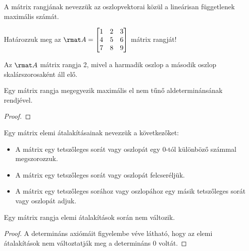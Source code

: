 \begin{definition}
  A mátrix rangjának nevezzük az oszlopvektorai közül a lineárisan függetlenek
  maximális számát.
\end{definition}

\begin{example}
  \bgroup\sffamily
  Határozzuk meg az $\rmat A = \begin{bmatrix}
      1 & 2 & 3 \\
      4 & 5 & 6 \\
      7 & 8 & 9
    \end{bmatrix}$ mátrix rangját!
  \egroup

  \hdashrule[.8ex][x]{\dimexpr\textwidth}{1pt}{2mm 3pt}
  Az $\rmat A$ mátrix rangja 2, mivel a harmadik oszlop a második oszlop
  skalárszorosaként áll elő.
\end{example}

\begin{theorem}
  Egy mátrix rangja megegyezik maximális el nem tűnő aldeterminánsának
  rendjével.

  \begin{proof}
    \vspace{10em}
  \end{proof}
\end{theorem}

\begin{definition}
  Egy mátrix elemi átalakításainak nevezzük a következőket:
  \begin{itemize}
    \item A mátrix egy tetszőleges sorát vagy oszlopát egy 0-tól különböző
          számmal megszorozzuk.

    \item A mátrix egy tetszőleges sorát vagy oszlopát felcseréljük.

    \item A mátrix egy tetszőleges sorához vagy oszlopához egy másik tetszőleges
          sorát vagy
          oszlopát adjuk.
  \end{itemize}
\end{definition}

\begin{statement}
  Egy mátrix rangja elemi átalakítások során nem változik.

  \begin{proof}
    A determináns axiómáit figyelembe véve látható, hogy az elemi
    átalakítások nem változtatják meg a determináns 0 voltát.
  \end{proof}
\end{statement}

